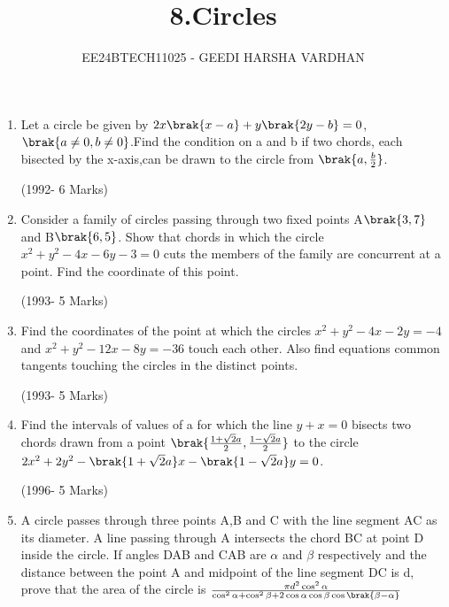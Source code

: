 \documentclass[journal,12pt,twocolumn]{IEEEtran}
\theoremstyle{remark}
\begin{document}

\vspace{3cm}

\title{8.Circles }
\author{EE24BTECH11025 - GEEDI HARSHA VARDHAN }
\maketitle
\newpage
\bigskip

\renewcommand{\thefigure}{\theenumi}
\renewcommand{\thetable}{\theenumi}

\begin{enumerate}

	\item Let a circle be given by $2x\brak{x-a}+y\brak{2y-b}=0$,$\brak{a\neq0,b\neq0}$.Find the condition on a and b if two chords, each bisected by the x-axis,can be drawn to the circle from $\brak{a,\frac{b}{2}}$.                         

\hfill(1992- 6 Marks)\\




\item Consider a family of circles passing through two fixed points A$\brak{3,7}$ and B$\brak{6,5}$. Show that chords in which the circle $x^2+y^2-4x-6y-3=0$ cuts the members of the family are concurrent at a point. Find the coordinate of this point.
	        
\hfill(1993- 5 Marks)\\





\item Find the coordinates of the point at which the circles $x^2+y^2-4x-2y=-4$ and $x^2+y^2-12x-8y=-36$ touch each other. Also find equations common tangents touching the circles in the distinct points.                        

\hfill(1993- 5 Marks)\\


\item Find the intervals of values of a for which the line $y+x=0$ bisects two chords drawn from a point $\brak {\frac{1+\sqrt{2}a}{2},\frac{1-\sqrt{2}a}{2}}$ to the circle $2x^2+2y^2-\brak{1+\sqrt{2}a}x-\brak{1-\sqrt{2}a}y=0$.  

\hfill(1996- 5 Marks)\\





\item A circle passes through three points A,B and C with the line segment AC as its diameter. A line passing through A intersects the chord BC at point D inside the circle. If angles DAB and CAB are $\alpha$ and $\beta$ respectively and the distance between the point A and midpoint of the line segment DC is d, prove that the area of the circle is $\frac{\pi d^2 \cos^2{\alpha} }{\cos^2{\alpha}+\cos^2{\beta}+ 2\cos{\alpha} \cos{\beta} \cos{\brak{\beta-\alpha}}}$                


\end{enumerate}
\end{document}
